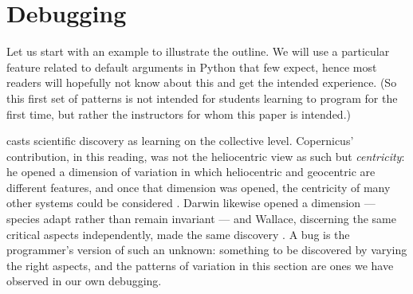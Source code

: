 \mode*
{}

\section{Debugging}
\label{debugging}

Let us start with an example to illustrate the outline.
We will use a particular feature related to default arguments in Python that 
few expect, hence most readers will hopefully not know about this and get the 
intended experience.
(So this first set of patterns is not intended for students learning to program 
for the first time, but rather the instructors for whom this paper is 
intended.)

\Textcite[Ch.~6]{NCOL} casts scientific discovery as learning on the collective
level. Copernicus' contribution, in this reading, was not the heliocentric view
as such but \emph{centricity}: he opened a dimension of variation in which
heliocentric and geocentric are different features, and once that dimension was
opened, the centricity of many other systems could be considered
\autocite[pp.~155--156]{NCOL}. Darwin likewise opened a dimension --- species
adapt rather than remain invariant --- and Wallace, discerning the same critical
aspects independently, made the same discovery \autocite[pp.~157--160]{NCOL}. A
bug is the programmer's version of such an unknown: something to be discovered
by varying the right aspects, and the patterns of variation in this section are
ones we have observed in our own debugging.


